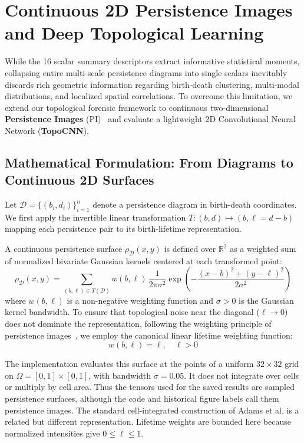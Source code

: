 \documentclass[11pt,a4paper]{article}
\begin{document}
\section{Continuous 2D Persistence Images and Deep Topological Learning}

While the 16 scalar summary descriptors extract informative statistical moments, collapsing entire multi-scale persistence diagrams into single scalars inevitably discards rich geometric information regarding birth-death clustering, multi-modal distributions, and localized spatial correlations. To overcome this limitation, we extend our topological forensic framework to continuous two-dimensional \textbf{Persistence Images} (PI)~\cite{adams2017persistence} and evaluate a lightweight 2D Convolutional Neural Network (\textbf{TopoCNN}).

\subsection{Mathematical Formulation: From Diagrams to Continuous 2D Surfaces}
Let $\mathcal{D} = \{ (b_i, d_i) \}_{i=1}^n$ denote a persistence diagram in birth-death coordinates. We first apply the invertible linear transformation $T: (b, d) \mapsto (b, \ell = d - b)$ mapping each persistence pair to its birth-lifetime representation. 

A continuous persistence surface $\rho_{\mathcal{D}}(x, y)$ is defined over $\mathbb{R}^2$ as a weighted sum of normalized bivariate Gaussian kernels centered at each transformed point:
\begin{equation}
    \rho_{\mathcal{D}}(x, y) = \sum_{(b, \ell) \in T(\mathcal{D})} w(b, \ell) \, \frac{1}{2\pi \sigma^2} \exp\left( -\frac{(x - b)^2 + (y - \ell)^2}{2\sigma^2} \right)
\end{equation}
where $w(b, \ell)$ is a non-negative weighting function and $\sigma > 0$ is the Gaussian kernel bandwidth. To ensure that topological noise near the diagonal ($\ell \to 0$) does not dominate the representation, following the weighting principle of persistence images~\cite{adams2017persistence}, we employ the canonical linear lifetime weighting function:
\begin{equation}
    w(b, \ell) = \ell, \quad \ell > 0
\end{equation}

The implementation evaluates this surface at the points of a uniform $32\times32$ grid on $\Omega=[0,1]\times[0,1]$, with bandwidth $\sigma=0.05$. It does not integrate over cells or multiply by cell area. Thus the tensors used for the saved results are sampled persistence surfaces, although the code and historical figure labels call them persistence images. The standard cell-integrated construction of Adams et al. is a related but different representation. Lifetime weights are bounded here because normalized intensities give $0\le\ell\le1$.
\end{document}
